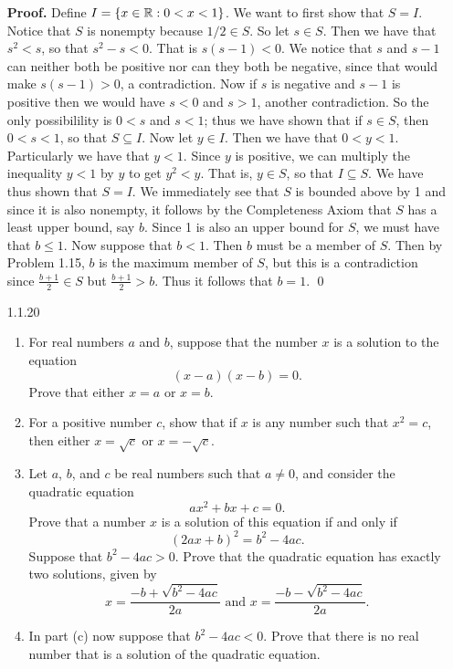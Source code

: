 \begin{enumerate}
      \textbf{Proof.} Define $I = \{x \in \mathbb{R}: 0 < x < 1\}$. We want to first 
      show that $S = I$. Notice that $S$ is nonempty because $1/2 \in S$. So let
      $s \in S$. Then we have that $s^2 < s$, so that $s^2 - s < 0$. That is
      $s(s - 1) < 0$. We notice that $s$ and $s - 1$ can neither both be   
      positive nor can they both be negative, since that would make
      $s(s - 1) > 0$, a contradiction. Now if $s$ is negative and $s - 1$ is 
      positive then we would have $s < 0$ and $s > 1$, another contradiction. So
      the only possibilility is $0 < s$ and $s < 1$; thus we have shown that if
      $s \in S$, then $0 < s < 1$, so that $S \subseteq I$. Now let $y \in I$.
      Then we have that $0 < y < 1$. Particularly we have that $y < 1$. Since
      $y$ is positive, we can multiply the inequality $y < 1$ by $y$ to get
      $y^2 < y$. That is, $y \in S$, so that $I \subseteq S$. We have thus
      shown that $S = I$. We immediately see that $S$ is bounded above by 1 and
      since it is also nonempty, it follows by the Completeness Axiom that $S$
      has a least upper bound, say $b$. Since 1 is also an upper bound for $S$,
      we must have that $b \le 1$. Now suppose that $b < 1$. Then $b$ must
      be a member of $S$. Then by Problem 1.15, $b$ is the maximum member of
      $S$, but this is a contradiction since $\frac{b + 1}{2} \in S$ but
      $\frac{b + 1}{2} > b$. Thus it follows that $b = 1$. \qed
   \item[1.1.20] 
                  \begin{enumerate}
                     \item For real numbers $a$ and $b$, suppose that the number
                           $x$ is a solution to the equation
                           $$(x - a)(x - b) = 0.$$
                           Prove that either $x = a$ or $x = b$.
                     \item For a positive number $c$, show that if $x$ is any 
                           number such that $x^2 = c$, then either $x=\sqrt{c}$ 
                           or $x = -\sqrt{c}$.
                     \item Let $a$, $b$, and $c$ be real numbers such that
                           $a \neq 0$, and consider the quadratic equation
                           $$ax^2 + bx + c = 0.$$
                           Prove that a number $x$ is a solution of this
                           equation if and only if
                           $$(2ax + b)^2 = b^2 - 4ac.$$
                           Suppose that $b^2 - 4ac > 0$. Prove that the 
                           quadratic equation has exactly two solutions, given 
                           by
                           $$x = \frac{-b  + \sqrt{b^2 - 4ac}}{2a} \mbox{ and }
                             x = \frac{-b  - \sqrt{b^2 - 4ac}}{2a}.$$
                     \item In part (c) now suppose that $b^2 - 4ac < 0$. Prove 
                           that there is no real number that is a solution of 
                           the quadratic equation.
                  \end{enumerate}
	  

\end{enumerate}
